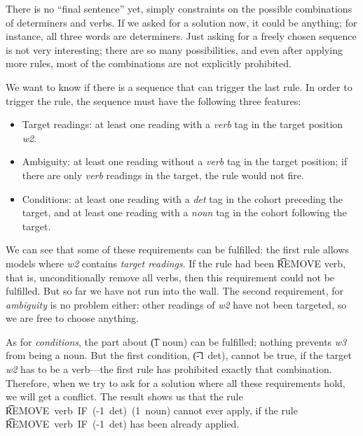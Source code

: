 There is no ``final sentence'' yet, simply constraints on the possible combinations of determiners and verbs. If we asked for a solution now, it could be anything; for instance, all three words are determiners. Just asking for a freely chosen sequence is not very interesting; there are so many possibilities, and even after applying more rules, most of the combinations are not explicitly prohibited. 

We want to know if there is a sequence that can trigger the last rule.
In order to trigger the rule, the sequence must have the following three features:
\begin{itemize}
\item Target readings: at least one reading with a \emph{verb} tag in the target position {\em w2}.
\item Ambiguity: at least one reading without a \emph{verb} tag in the target position; if there are only \emph{verb} readings in the target, the rule would not fire.
\item Conditions: at least one reading with a \emph{det} tag in the cohort preceding the target, and at least one reading with a \emph{noun} tag in the cohort following the target.
\end{itemize}


We can see that some of these requirements can be fulfilled: the first rule allows models where {\em w2} contains \emph{target readings}. If the rule had been \t{REMOVE verb}, that is, unconditionally remove all verbs, then this requirement could not be fulfilled. But so far we have not run into the wall. 
The second requirement, for \emph{ambiguity} is no problem either: other readings of {\em w2} have not been targeted, so we are free to choose anything.

As for \emph{conditions}, the part about \t{(1 noun)} can be fulfilled; nothing prevents {\em w3} from being a noun. But the first condition, \t{(-1 det)}, cannot be true, if the target {\em w2} has to be a verb---the first rule has prohibited exactly that combination.
Therefore, when we try to ask for a solution where all these requirements hold, we will get a conflict. The result shows us that the rule \t{REMOVE~verb~IF~(-1~det)~(1~noun)} cannot ever apply, if the rule \t{REMOVE~verb~IF~(-1~det)} has been already applied. 

